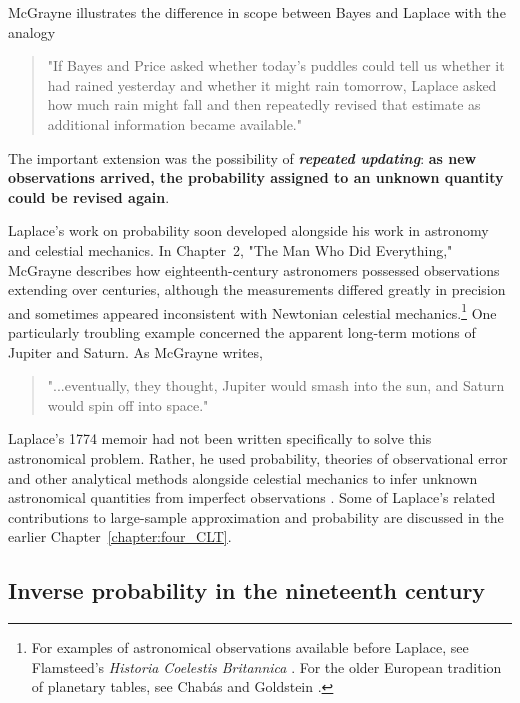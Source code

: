 \noindent
McGrayne illustrates the difference in scope between Bayes and Laplace with the analogy

\begin{quote}
"If Bayes and Price asked whether today's puddles could tell us whether it had rained yesterday and whether it might rain tomorrow, Laplace asked how much rain might fall and then repeatedly revised that estimate as additional information became available."
\cite{mcgrayne2011}
\end{quote}

The important extension was the possibility of \textbf{\textit{repeated updating}}: \textbf{as new observations arrived, the probability assigned to an unknown quantity could be revised again}.

Laplace's work on probability soon developed alongside his work in astronomy and celestial mechanics. In Chapter~2, "The Man Who Did Everything," McGrayne describes how eighteenth-century astronomers possessed observations extending over centuries, although the measurements differed greatly in precision and sometimes appeared inconsistent with Newtonian celestial mechanics.\footnote{For examples of astronomical observations available before Laplace, see Flamsteed's \textit{Historia Coelestis Britannica} \cite{flamsteed1725}. For the older European tradition of planetary tables, see Chabás and Goldstein \cite{chabasgoldstein2012}.} One particularly troubling example concerned the apparent long-term motions of Jupiter and Saturn. As McGrayne writes,

\begin{quote}
"...eventually, they thought, Jupiter would smash into the sun, and Saturn would spin off into space."
\cite{mcgrayne2011}
\end{quote}


Laplace's 1774 memoir had not been written specifically to solve this astronomical problem. Rather, he used probability, theories of observational error and other analytical methods alongside celestial mechanics to infer unknown astronomical quantities from imperfect observations \cite{mcgrayne2011}. Some of Laplace's related contributions to large-sample approximation and probability are discussed in the earlier Chapter~\ref{chapter:four_CLT}.


\subsection{Inverse probability in the nineteenth century}

